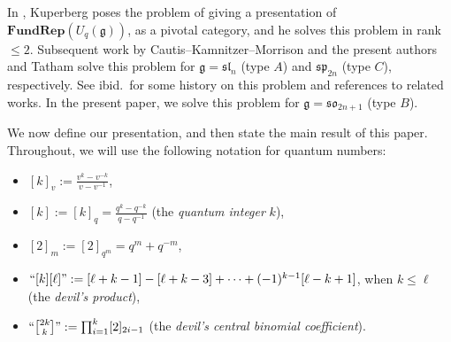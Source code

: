 \documentclass[10pt]{amsart}
\numberwithin{equation}{section}
\theoremstyle{definition}
\newcommand{\sln}[1][n]{\mathfrak{sl}_{#1}}
\newcommand{\spn}[1][2n]{\mathfrak{sp}_{#1}}
\newcommand{\son}[1][2n+1]{\mathfrak{so}_{#1}}
\newcommand{\FRep}{\mathbf{FundRep}}
\begin{document}
In \cite{Kup}, Kuperberg poses the problem of giving a presentation of 
$\FRep(U_q(\mathfrak{g}))$, as a pivotal category, 
and he solves this problem in rank $\leq 2$.
Subsequent work by Cautis--Kamnitzer--Morrison \cite{CKM} 
and the present authors and Tatham \cite{BERT,BERT2} solve this problem 
for $\mathfrak{g}=\sln$ (type $A$) and $\spn$ (type $C$), respectively.
See ibid.~for some history on this problem and references to related works.
In the present paper, we solve this problem for $\mathfrak{g} = \son$ (type $B$).

We now define our presentation, and then state the main result of this paper.
Throughout, we will use the following notation for quantum numbers:
\begin{itemize}
\item $[k]_v:= \tfrac{v^k - v^{-k}}{v - v^{-1}}$,
\item $[k] := [k]_q = \tfrac{q^k - q^{-k}}{q - q^{-1}}$ (the \emph{quantum integer} $k$),
\item $[2]_{m} := [2]_{q^m} = q^m + q^{-m}$,
\item $``[k][\ell]" := [\ell+k-1] - [\ell+k-3] + \cdots + (-1)^{k-1} [\ell-k+1]$, 
when $k\le \ell$ (the \emph{devil's product}), 
\item $``{2k \brack k}" := \prod_{i=1}^k [2]_{2i-1}$ (the \emph{devil's central binomial coefficient}).
\end{itemize}
\end{document}
